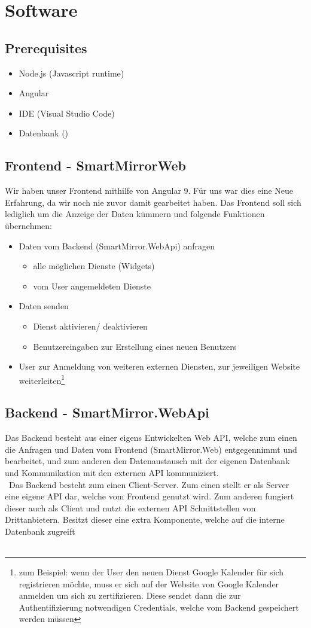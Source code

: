 \section{Software}
\subsection{Prerequisites}
\begin{itemize}
\item Node.js (Javascript runtime)
\item Angular
\item IDE (Visual Studio Code)
\item Datenbank ()
\end{itemize}

\subsection{Frontend - SmartMirrorWeb}
Wir haben unser Frontend mithilfe von Angular 9. Für uns war dies eine Neue Erfahrung, da wir noch nie zuvor damit gearbeitet haben. Das Frontend soll sich lediglich um die Anzeige der Daten kümmern und folgende Funktionen übernehmen:
\begin{itemize}
\item Daten vom Backend (SmartMirror.WebApi) anfragen
\begin{itemize}
\item alle möglichen Dienste (Widgets)
\item vom User angemeldeten Dienste
\end{itemize}
\item Daten senden
\begin{itemize}
\item Dienst aktivieren/ deaktivieren
\item Benutzereingaben zur Erstellung eines neuen Benutzers
\end{itemize}
\item User zur Anmeldung von weiteren externen Diensten, zur jeweiligen Website weiterleiten\footnote{zum Beispiel: wenn der User den neuen Dienst Google Kalender für sich registrieren möchte, muss er sich auf der Website von Google Kalender anmelden um sich zu zertifizieren. Diese sendet dann die zur Authentifizierung notwendigen Credentials, welche vom Backend gespeichert werden müssen }
\end{itemize} 
\subsection{Backend - SmartMirror.WebApi}
Das Backend besteht aus einer eigens Entwickelten Web API, welche zum einen die Anfragen und Daten vom Frontend (SmartMirror.Web) entgegennimmt und bearbeitet, und zum anderen den Datenaustausch mit der eigenen Datenbank und Kommunikation mit den externen API kommuniziert.\\\
Das Backend besteht zum einen Client-Server. Zum einen stellt er als Server eine eigene API dar, welche vom Frontend genutzt wird. Zum anderen fungiert dieser auch als Client und nutzt die externen API Schnittstellen von Drittanbietern. Besitzt dieser eine extra Komponente, welche auf die interne Datenbank zugreift\\\
